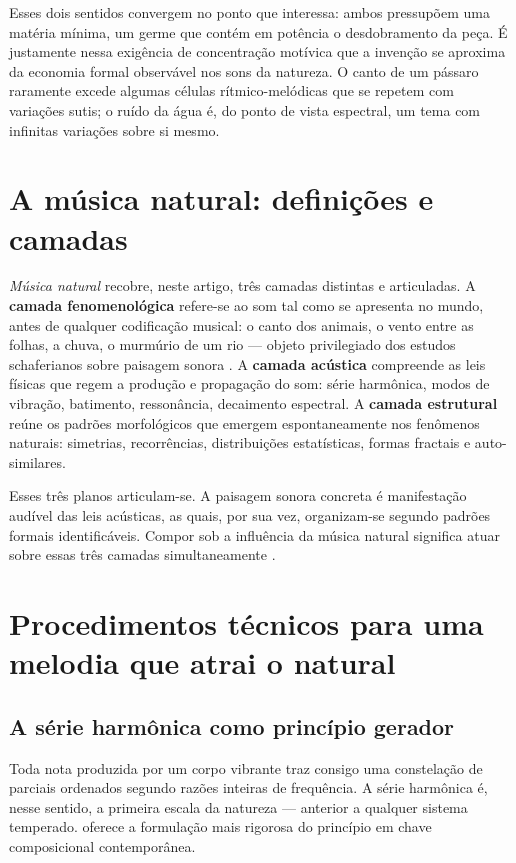 \documentclass[12pt,a4paper]{article}
\begin{document}
Esses dois sentidos convergem no ponto que interessa: ambos pressupõem uma matéria mínima, um germe que contém em potência o desdobramento da peça. É justamente nessa exigência de concentração motívica que a invenção se aproxima da economia formal observável nos sons da natureza. O canto de um pássaro raramente excede algumas células rítmico-melódicas que se repetem com variações sutis; o ruído da água é, do ponto de vista espectral, um tema com infinitas variações sobre si mesmo.

\section{A música natural: definições e camadas}

\textit{Música natural} recobre, neste artigo, três camadas distintas e articuladas. A \textbf{camada fenomenológica} refere-se ao som tal como se apresenta no mundo, antes de qualquer codificação musical: o canto dos animais, o vento entre as folhas, a chuva, o murmúrio de um rio --- objeto privilegiado dos estudos schaferianos sobre paisagem sonora \citep{Schafer1994}. A \textbf{camada acústica} compreende as leis físicas que regem a produção e propagação do som: série harmônica, modos de vibração, batimento, ressonância, decaimento espectral. A \textbf{camada estrutural} reúne os padrões morfológicos que emergem espontaneamente nos fenômenos naturais: simetrias, recorrências, distribuições estatísticas, formas fractais e auto-similares.

Esses três planos articulam-se. A paisagem sonora concreta é manifestação audível das leis acústicas, as quais, por sua vez, organizam-se segundo padrões formais identificáveis. Compor sob a influência da música natural significa atuar sobre essas três camadas simultaneamente \citep{Wisnik1989}.

\section{Procedimentos técnicos para uma melodia que atrai o natural}

\subsection{A série harmônica como princípio gerador}

Toda nota produzida por um corpo vibrante traz consigo uma constelação de parciais ordenados segundo razões inteiras de frequência. A série harmônica é, nesse sentido, a primeira escala da natureza --- anterior a qualquer sistema temperado. \citet{Grisey2008} oferece a formulação mais rigorosa do princípio em chave composicional contemporânea.
\end{document}
